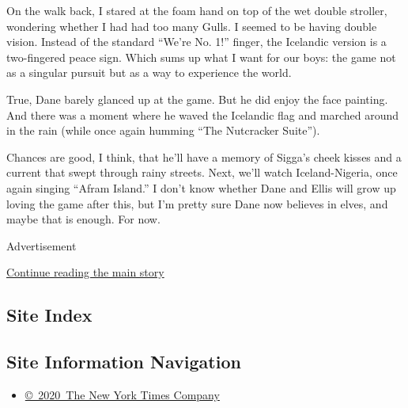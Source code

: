 On the walk back, I stared at the foam hand on top of the wet double
stroller, wondering whether I had had too many Gulls. I seemed to be
having double vision. Instead of the standard ``We're No. 1!'' finger,
the Icelandic version is a two-fingered peace sign. Which sums up what I
want for our boys: the game not as a singular pursuit but as a way to
experience the world.

True, Dane barely glanced up at the game. But he did enjoy the face
painting. And there was a moment where he waved the Icelandic flag and
marched around in the rain (while once again humming ``The Nutcracker
Suite'').

Chances are good, I think, that he'll have a memory of Sigga's cheek
kisses and a current that swept through rainy streets. Next, we'll watch
Iceland-Nigeria, once again singing ``Afram Island.'' I don't know
whether Dane and Ellis will grow up loving the game after this, but I'm
pretty sure Dane now believes in elves, and maybe that is enough. For
now.

Advertisement

\protect\hyperlink{after-bottom}{Continue reading the main story}

\hypertarget{site-index}{%
\subsection{Site Index}\label{site-index}}

\hypertarget{site-information-navigation}{%
\subsection{Site Information
Navigation}\label{site-information-navigation}}

\begin{itemize}
\tightlist
\item
  \href{https://help.nytimes3xbfgragh.onion/hc/en-us/articles/115014792127-Copyright-notice}{©~2020~The
  New York Times Company}
\end{itemize}

